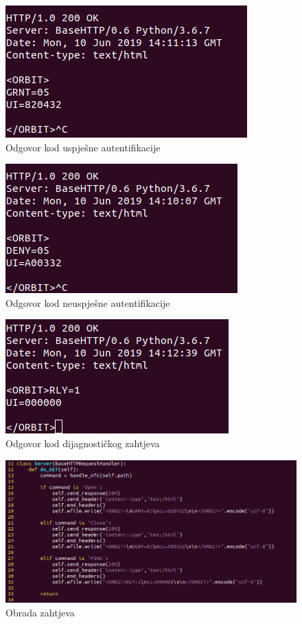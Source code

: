 \documentclass[times, utf8, zavrsni]{fer}
\begin{document}
\begin{figure}[H]
\includegraphics[scale=0.6]{grant.png}
\centering
\caption{Odgovor kod uspješne autentifikacije}
\centering
\end{figure}

\begin{figure}[H]
\includegraphics[scale=0.6]{deny.png}
\centering
\caption{Odgovor kod neuspješne autentifikacije}
\centering
\end{figure}

\begin{figure}[H]
\includegraphics[scale=0.6]{ping.png}
\centering
\caption{Odgovor kod dijagnostičkog zahtjeva}
\centering
\end{figure}

\begin{figure}[H]
\includegraphics[scale=0.5]{server.png}
\centering
\caption{Obrada zahtjeva}
\centering
\end{figure}
\end{document}
